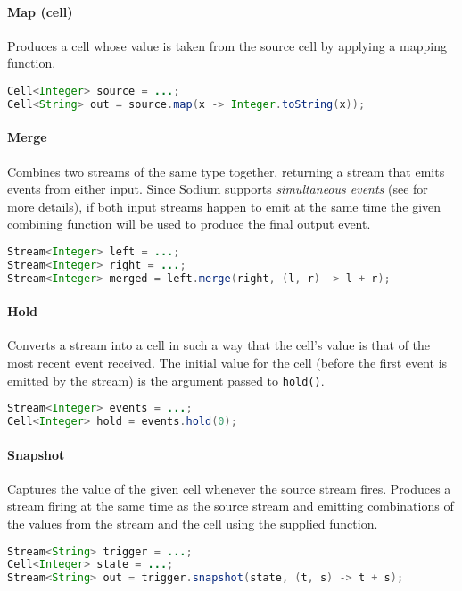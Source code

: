 \paragraph{Map (cell)}
Produces a cell whose value is taken from the source cell by applying a mapping function.
%
\begin{lstlisting}[frame=single, language=java]
Cell<Integer> source = ...;
Cell<String> out = source.map(x -> Integer.toString(x));
\end{lstlisting}

\paragraph{Merge}
Combines two streams of the same type together, returning a stream that emits events from either input.
%
Since Sodium supports \textit{simultaneous events} (see  for more details), if both input streams happen to emit at the same time the given combining function will be used to produce the final output event.
%
\begin{lstlisting}[frame=single, language=java]
Stream<Integer> left = ...;
Stream<Integer> right = ...;
Stream<Integer> merged = left.merge(right, (l, r) -> l + r);
\end{lstlisting}

\paragraph{Hold}
Converts a stream into a cell in such a way that the cell's value is that of the most recent event received.
%
The initial value for the cell (before the first event is emitted by the stream) is the argument passed to \texttt{hold()}.
%
\begin{lstlisting}[frame=single, language=java]
Stream<Integer> events = ...;
Cell<Integer> hold = events.hold(0);
\end{lstlisting}

\paragraph{Snapshot}
Captures the value of the given cell whenever the source stream fires.
%
Produces a stream firing at the same time as the source stream and emitting combinations of the values from the stream and the cell using the supplied function.
%
\begin{lstlisting}[frame=single, language=java]
Stream<String> trigger = ...;
Cell<Integer> state = ...;
Stream<String> out = trigger.snapshot(state, (t, s) -> t + s);
\end{lstlisting}

